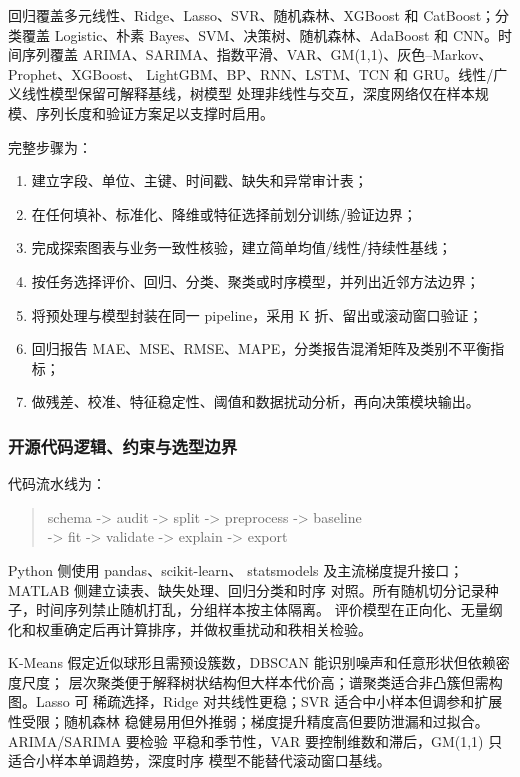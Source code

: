 \documentclass[UTF8,a4paper,12pt]{ctexart}
\begin{document}
回归覆盖多元线性、Ridge、Lasso、SVR、随机森林、XGBoost 和 CatBoost；分类覆盖
Logistic、朴素 Bayes、SVM、决策树、随机森林、AdaBoost 和 CNN。时间序列覆盖
ARIMA、SARIMA、指数平滑、VAR、GM(1,1)、灰色--Markov、Prophet、XGBoost、
LightGBM、BP、RNN、LSTM、TCN 和 GRU。线性/广义线性模型保留可解释基线，树模型
处理非线性与交互，深度网络仅在样本规模、序列长度和验证方案足以支撑时启用。

完整步骤为：
\begin{enumerate}
  \item 建立字段、单位、主键、时间戳、缺失和异常审计表；
  \item 在任何填补、标准化、降维或特征选择前划分训练/验证边界；
  \item 完成探索图表与业务一致性核验，建立简单均值/线性/持续性基线；
  \item 按任务选择评价、回归、分类、聚类或时序模型，并列出近邻方法边界；
  \item 将预处理与模型封装在同一 pipeline，采用 K 折、留出或滚动窗口验证；
  \item 回归报告 MAE、MSE、RMSE、MAPE，分类报告混淆矩阵及类别不平衡指标；
  \item 做残差、校准、特征稳定性、阈值和数据扰动分析，再向决策模块输出。
\end{enumerate}

\subsubsection{开源代码逻辑、约束与选型边界}

代码流水线为：
\begin{quote}
\small\ttfamily
schema -> audit -> split -> preprocess -> baseline\\
-> fit -> validate -> explain -> export
\end{quote}
Python 侧使用 pandas、scikit-learn、
statsmodels 及主流梯度提升接口；MATLAB 侧建立读表、缺失处理、回归分类和时序
对照。所有随机切分记录种子，时间序列禁止随机打乱，分组样本按主体隔离。
评价模型在正向化、无量纲化和权重确定后再计算排序，并做权重扰动和秩相关检验。

K-Means 假定近似球形且需预设簇数，DBSCAN 能识别噪声和任意形状但依赖密度尺度；
层次聚类便于解释树状结构但大样本代价高；谱聚类适合非凸簇但需构图。Lasso 可
稀疏选择，Ridge 对共线性更稳；SVR 适合中小样本但调参和扩展性受限；随机森林
稳健易用但外推弱；梯度提升精度高但要防泄漏和过拟合。ARIMA/SARIMA 要检验
平稳和季节性，VAR 要控制维数和滞后，GM(1,1) 只适合小样本单调趋势，深度时序
模型不能替代滚动窗口基线。
\end{document}
